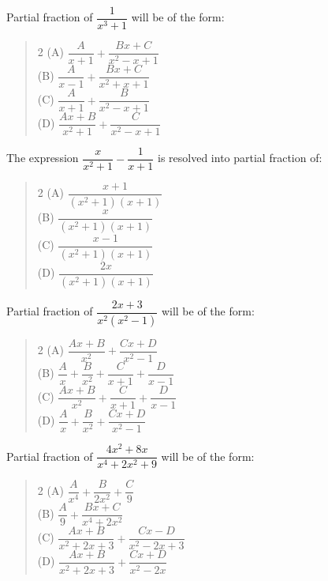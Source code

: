 \documentclass[11pt,a4paper]{article}
\begin{document}
\begin{mcqlist}
\item Partial fraction of $\dfrac{1}{x^3+1}$ will be of the form:
\begin{quote}\begin{multicols}{2}
\noindent (A) $\dfrac{A}{x+1}+\dfrac{Bx+C}{x^2-x+1}$ \\
(B) $\dfrac{A}{x-1}+\dfrac{Bx+C}{x^2+x+1}$ \\
(C) $\dfrac{A}{x+1}+\dfrac{B}{x^2-x+1}$ \\
(D) $\dfrac{Ax+B}{x^2+1}+\dfrac{C}{x^2-x+1}$
\end{multicols}\end{quote}

\item The expression $\dfrac{x}{x^2+1}-\dfrac{1}{x+1}$ is resolved into partial fraction of:
\begin{quote}\begin{multicols}{2}
\noindent (A) $\dfrac{x+1}{(x^2+1)(x+1)}$ \\
(B) $\dfrac{x}{(x^2+1)(x+1)}$ \\
(C) $\dfrac{x-1}{(x^2+1)(x+1)}$ \\
(D) $\dfrac{2x}{(x^2+1)(x+1)}$
\end{multicols}\end{quote}

\item Partial fraction of $\dfrac{2x+3}{x^2(x^2-1)}$ will be of the form:
\begin{quote}\begin{multicols}{2}
\noindent (A) $\dfrac{Ax+B}{x^2}+\dfrac{Cx+D}{x^2-1}$ \\
(B) $\dfrac{A}{x}+\dfrac{B}{x^2}+\dfrac{C}{x+1}+\dfrac{D}{x-1}$ \\
(C) $\dfrac{Ax+B}{x^2}+\dfrac{C}{x+1}+\dfrac{D}{x-1}$ \\
(D) $\dfrac{A}{x}+\dfrac{B}{x^2}+\dfrac{Cx+D}{x^2-1}$
\end{multicols}\end{quote}

\item Partial fraction of $\dfrac{4x^2+8x}{x^4+2x^2+9}$ will be of the form:
\begin{quote}\begin{multicols}{2}
\noindent (A) $\dfrac{A}{x^4}+\dfrac{B}{2x^2}+\dfrac{C}{9}$ \\
(B) $\dfrac{A}{9}+\dfrac{Bx+C}{x^4+2x^2}$ \\
(C) $\dfrac{Ax+B}{x^2+2x+3}+\dfrac{Cx-D}{x^2-2x+3}$ \\
(D) $\dfrac{Ax+B}{x^2+2x+3}+\dfrac{Cx+D}{x^2-2x}$
\end{multicols}\end{quote}


\end{mcqlist}
\end{document}
